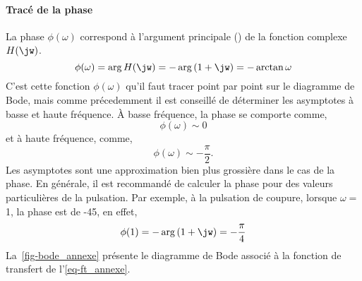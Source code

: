 \paragraph{Tracé de la phase}
La phase $\phi(\omega)$ correspond à l'argument principale () 
de la fonction complexe $H(\jw)$.
\[
\phi(\omega)=\arg{H(\jw)}=-\arg{(1+\jw)}=-\arctan{\omega}
\]
C'est cette fonction $\phi(\omega)$ qu'il faut tracer point par point 
sur le diagramme de Bode, mais comme précedemment
il est conseillé de déterminer les asymptotes à basse et haute fréquence.
\`A basse fréquence, la phase se comporte comme,
\[
\phi(\omega)\sim 0
\] 
et à haute fréquence, comme, 
\[
\phi(\omega)\sim -\dfrac{\pi}{2}.
\]
Les asymptotes sont une approximation bien plus 
grossière dans le cas de la phase. 
En générale, il est recommandé de 
calculer la phase pour des valeurs particulières de la 
pulsation. Par exemple, à la pulsation de coupure, 
lorsque $\omega=$1, la phase est de -45\degree, en effet,
\[
\phi(1)=-\arg{(1+\jw)}=-\dfrac{\pi}{4}
\]
La~\cref{fig-bode_annexe} présente le diagramme de Bode associé à 
la fonction de transfert de l'\cref{eq-ft_annexe}.
